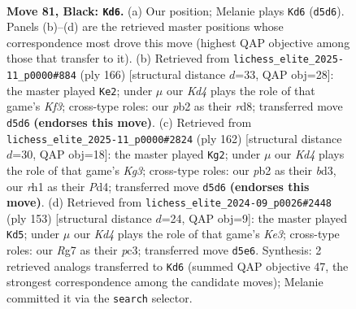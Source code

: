 \documentclass[11pt]{article}
\begin{document}
\begin{figure}[p]\centering
\begin{subfigure}{0.46\textwidth}\centering
\resizebox{\linewidth}{!}{%
\newchessgame
\chessboard[
  setfen={8/6r1/p7/Pppk1p1p/2p2P1P/4PKP1/1P6/7R b - - 8 81},
  showmover=false,
  pgfstyle=straightmove, color=movearrow, markmove={d5-d6}
]}
\caption{}
\end{subfigure}\hfill
\begin{subfigure}{0.46\textwidth}\centering
\resizebox{\linewidth}{!}{%
\newchessgame
\chessboard[
  setfen={3r4/1p6/p1p2kp1/P6p/1P3P1P/4PK2/2R5/8 w - - 3 84},
  showmover=false,
  pgfstyle=straightmove, color=movearrow, markmove={f3-e2}
]}
\caption{}
\end{subfigure}
\\[4pt]
\begin{subfigure}{0.46\textwidth}\centering
\resizebox{\linewidth}{!}{%
\newchessgame
\chessboard[
  setfen={3B4/5kp1/p4p1p/1p1p3P/3P2P1/P1Pb1PK1/8/8 w - - 43 82},
  showmover=false,
  pgfstyle=straightmove, color=movearrow, markmove={g3-g2}
]}
\caption{}
\end{subfigure}\hfill
\begin{subfigure}{0.46\textwidth}\centering
\resizebox{\linewidth}{!}{%
\newchessgame
\chessboard[
  setfen={8/8/2p1kp2/1p3p1p/1P1Pp2P/2P1K1P1/5P2/8 b - - 3 77},
  showmover=false,
  pgfstyle=straightmove, color=movearrow, markmove={e6-d5}
]}
\caption{}
\end{subfigure}
\caption{\textbf{Move 81, Black: \texttt{Kd6}.} (a) Our position; Melanie plays \texttt{Kd6} (\texttt{d5d6}). Panels (b)--(d) are the retrieved master positions whose correspondence most drove this move (highest QAP objective among those that transfer to it). (b) Retrieved from \texttt{lichess\_elite\_2025-11\_p0000\#884} (ply 166) [structural distance $d$=33, QAP obj=28]: the master played \texttt{Ke2}; under $\mu$ our \emph{Kd4} plays the role of that game's \emph{Kf3}; cross-type roles: our \emph{p}b2 as their \emph{r}d8; transferred move \texttt{d5d6} \textbf{(endorses this move)}. (c) Retrieved from \texttt{lichess\_elite\_2025-11\_p0000\#2824} (ply 162) [structural distance $d$=30, QAP obj=18]: the master played \texttt{Kg2}; under $\mu$ our \emph{Kd4} plays the role of that game's \emph{Kg3}; cross-type roles: our \emph{p}b2 as their \emph{b}d3, our \emph{r}h1 as their \emph{P}d4; transferred move \texttt{d5d6} \textbf{(endorses this move)}. (d) Retrieved from \texttt{lichess\_elite\_2024-09\_p0026\#2448} (ply 153) [structural distance $d$=24, QAP obj=9]: the master played \texttt{Kd5}; under $\mu$ our \emph{Kd4} plays the role of that game's \emph{Ke3}; cross-type roles: our \emph{R}g7 as their \emph{p}c3; transferred move \texttt{d5e6}. Synthesis: 2 retrieved analogs transferred to \texttt{Kd6} (summed QAP objective 47, the strongest correspondence among the candidate moves); Melanie committed it via the \texttt{search} selector.}
\label{fig:thought-m161}
\end{figure}
\end{document}
